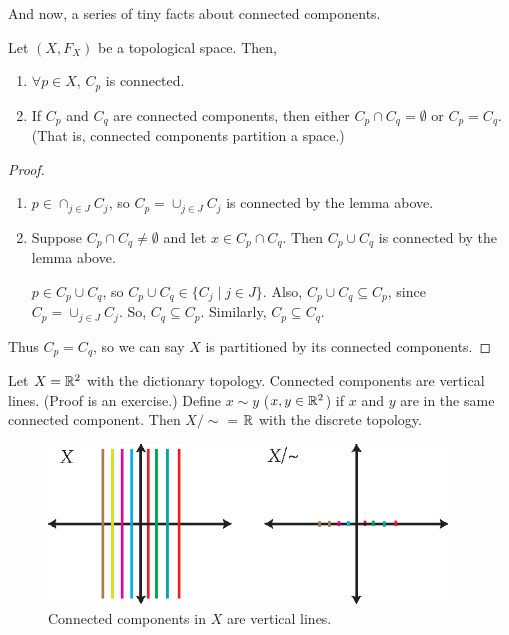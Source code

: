 And now, a series of tiny facts about connected components. 
\begin{smallfact}
	Let $(X, F_X)$ be a topological space. Then, 
	\begin{enumerate}
		\item $\forall p \in X$, $C_p$ is connected. 
		\item If $C_p$ and $C_q$ are connected components, then either $C_p\cap C_q = \emptyset$ or $C_p = C_q$. (That is, connected components partition a space.) 
	\end{enumerate}
\begin {proof} 
\begin{enumerate}
	\item $p\in {\cap_{j\in J} C_j}$, so $C_p = {\cup_{j\in J} C_j}$ is connected by the lemma above.
	\item Suppose $C_p \cap C_q \neq \emptyset$ and let $x\in C_p \cap C_q$. Then $C_p \cup C_q$ is connected by the lemma above.
	
	$p\in C_p \cup C_q$, so $C_p \cup C_q \in \{C_j\mid j\in J\}$. Also, $C_p \cup C_q \subseteq C_p$, since $C_p = {\cup_{j\in J} C_j}$. So, $C_q \subseteq C_p$. Similarly, $C_p \subseteq C_q$. 
\end{enumerate}
Thus $C_p = C_q$, so we can say $X$ is partitioned by its connected components. 
\end{proof}
\end{smallfact}
\begin{example}
Let $X = \mathbb R^2$ with the dictionary topology. Connected components are vertical lines. (Proof is an exercise.) Define $x\sim y$ ($x, y \in \mathbb R^2$) if $x$ and $y$ are in the same connected component. Then $X/\sim$ = $\mathbb R$ with the discrete topology. 
\begin{figure}[ht!]
    \centering
    \includegraphics[width=300pt]{images/connectedness/dictionary_sim}
    \caption{Connected components in $X$ are vertical lines.}
\end{figure}

\end{example}

